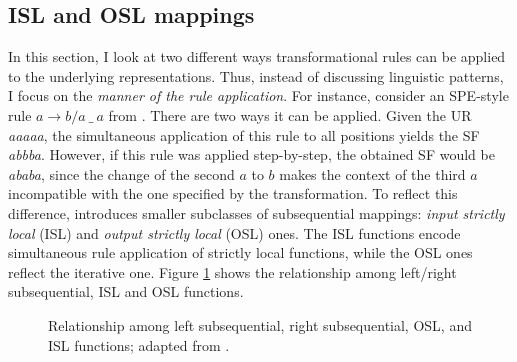 \subsection{ISL and OSL mappings}

In this section, I look at two different ways transformational rules can be applied to the underlying representations.
Thus, instead of discussing linguistic patterns, I focus on the \emph{manner of the rule application}.
For instance, consider an SPE-style rule $a \rightarrow b / a~ \_~ a$ from \citep{Chandlee2014}.
There are two ways it can be applied.
Given the UR \emph{aaaaa}, the simultaneous application of this rule to all positions yields the SF \emph{abbba}.
However, if this rule was applied step-by-step, the obtained SF would be \emph{ababa}, since the change of the second $a$ to $b$ makes the context of the third $a$ incompatible with the one specified by the transformation.
To reflect this difference, \cite{Chandlee2014} introduces smaller subclasses of subsequential mappings: \emph{input strictly local} (ISL) and \emph{output strictly local} (OSL) ones.
The ISL functions encode simultaneous rule application of strictly local functions, while the OSL ones reflect the iterative one.
Figure \ref{fig:ssqfunctionsmanyy} shows the relationship among left/right subsequential, ISL and OSL functions.


\begin{figure}[h!]
\begin{center}
\caption{Relationship among left subsequential, right subsequential, OSL, and ISL functions; adapted from \citep{Chandlee2014}.}
\label{fig:ssqfunctionsmanyy}
\end{center}
\end{figure}





